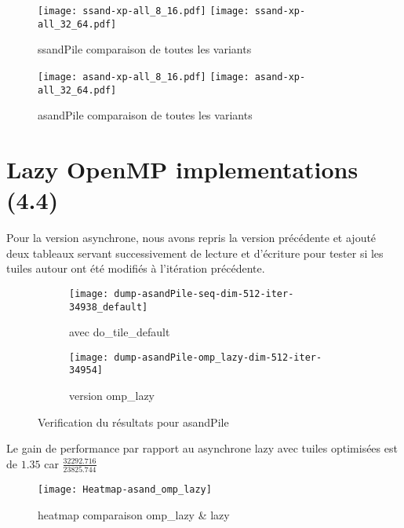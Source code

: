 \documentclass[10pt, a4paper]{article}
\begin{document}
\begin{figure}[H]
    \centering
    \texttt{[image: ssand-xp-all\_8\_16.pdf]}
    \texttt{[image: ssand-xp-all\_32\_64.pdf]}
    \caption{\small{ssandPile comparaison de toutes les variants}}
\end{figure}
\begin{figure}[H]
    \centering
    \texttt{[image: asand-xp-all\_8\_16.pdf]}
    \texttt{[image: asand-xp-all\_32\_64.pdf]}
    \caption{\small{asandPile comparaison de toutes les variants}}
\end{figure}

\section{Lazy OpenMP implementations (4.4)}

Pour la version asynchrone, nous avons repris la version précédente et ajouté deux tableaux
servant successivement de lecture et d'écriture pour tester si les tuiles autour ont été modifiés à l'itération précédente.

\begin{figure}[H]
    \centering
    \begin{subfigure}{.4\textwidth}
        \texttt{[image: dump-asandPile-seq-dim-512-iter-34938\_default]}
        \caption{\small{avec do\_tile\_default}}
    \end{subfigure}
    \begin{subfigure}{.4\textwidth}
        \texttt{[image: dump-asandPile-omp\_lazy-dim-512-iter-34954]}
        \caption{\small{version omp\_lazy}}
    \end{subfigure}
    \caption{Verification du résultats pour asandPile}
\end{figure}

Le gain de performance par rapport au asynchrone lazy avec tuiles optimisées est de $1.35$ car $\frac{32292.716}{23825.744}$

\begin{figure}[H]
    \centering
    \texttt{[image: Heatmap-asand\_omp\_lazy]}
    \caption{\small{heatmap comparaison omp\_lazy \& lazy}}
\end{figure}
\end{document}
